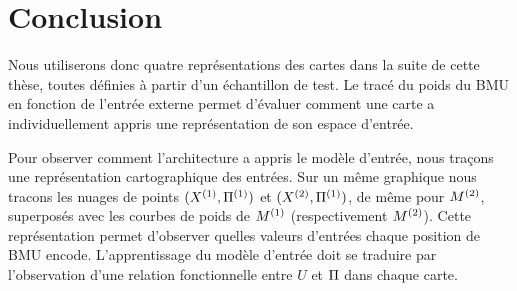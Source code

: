 






\section{Conclusion}

Nous utiliserons donc quatre représentations des cartes dans la suite de cette thèse, toutes définies à partir d'un échantillon de test.
Le tracé du poids du BMU en fonction de l'entrée externe permet d'évaluer comment une carte a individuellement appris une représentation de son espace d'entrée. 

Pour observer comment l'architecture a appris le modèle d'entrée, nous traçons une représentation cartographique des entrées. Sur un même graphique nous tracons les nuages de points $(X^{({1})},\Pi^{({1})})$ et $(X^{({2})},\Pi^{({1})})$, de même pour $M^{({2})}$, superposés avec les courbes de poids de $M^{({1})}$ (respectivement $M^{({2})}$). Cette représentation permet d'observer quelles valeurs d'entrées chaque position de BMU encode.
L'apprentissage du modèle d'entrée doit se traduire par l'observation d'une relation fonctionnelle entre $U$ et $\Pi$ dans chaque carte.


